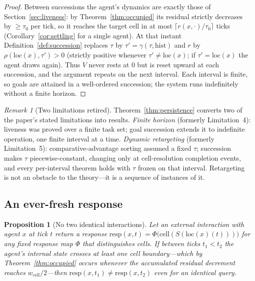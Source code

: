 \documentclass[11pt,twocolumn,a4paper]{article}
\theoremstyle{plain}
\newtheorem{proposition}[theorem]{Proposition}
\theoremstyle{definition}
\theoremstyle{remark}
\newtheorem{remark}[theorem]{Remark}
\newcommand{\tick}{\tau_0}
\newcommand{\cell}{\mathrm{cell}}
\newcommand{\Scal}{S}
\begin{document}
\begin{proof}
Between successions the agent's dynamics are exactly those of
Section~\ref{sec:liveness}: by Theorem~\ref{thm:occupied} its residual strictly
decreases by $\geq \tick$ per tick, so it reaches the target cell in at most
$\lceil r(x,\cdot)/\tick \rceil$ ticks (Corollary~\ref{cor:settling} for a single
agent). At that instant Definition~\ref{def:succession} replaces $\tau$ by
$\tau' = \gamma(\tau,\mathrm{hist})$ and $r$ by $\rho(\mathrm{loc}(x),\tau') > 0$
(strictly positive whenever $\tau' \neq \mathrm{loc}(x)$; if $\tau' = \mathrm{loc}(x)$
the agent draws again). Thus $V$ never rests at $0$ but is reset upward at each
succession, and the argument repeats on the next interval. Each interval is finite,
so goals are attained in a well-ordered succession; the system runs indefinitely
without a finite horizon.
\end{proof}

\begin{remark}[Two limitations retired]
Theorem~\ref{thm:persistence} converts two of the paper's stated limitations into
results. \emph{Finite horizon} (formerly Limitation~4): liveness was proved over a
finite task set; goal succession extends it to indefinite operation, one finite
interval at a time. \emph{Dynamic retargeting} (formerly Limitation~5):
comparative-advantage sorting assumed a fixed $\tau$; succession makes $\tau$
piecewise-constant, changing only at cell-resolution completion events, and every
per-interval theorem holds with $\tau$ frozen on that interval. Retargeting is not
an obstacle to the theory---it is a sequence of instances of it.
\end{remark}

\subsection{An ever-fresh response}

\begin{proposition}[No two identical interactions]
\label{prop:fresh}
Let an external interaction with agent $x$ at tick $t$ return a response
$\mathrm{resp}(x, t) = \Phi\bigl(\cell(\Scal(\mathrm{loc}(x)(t)))\bigr)$ for any
fixed response map $\Phi$ that distinguishes cells. If between ticks $t_1 < t_2$ the
agent's internal state crosses at least one cell boundary---which by
Theorem~\ref{thm:occupied} occurs whenever the accumulated residual decrement
reaches $w_{\cell}/2$---then $\mathrm{resp}(x, t_1) \neq \mathrm{resp}(x, t_2)$ even
for an identical query.
\end{proposition}
\end{document}
